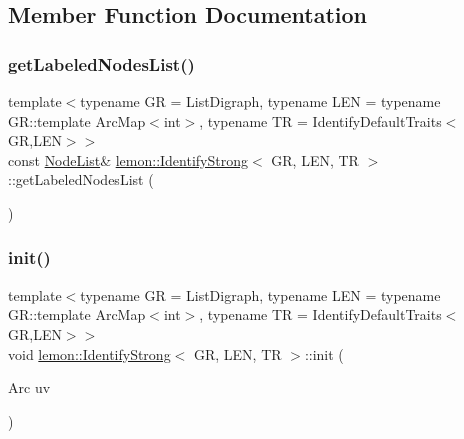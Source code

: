 \subsection{Member Function Documentation}
\mbox{\label{classlemon_1_1_identify_strong_a1d520289257e1b92d98e924c256aee24}} 
\subsubsection{\texorpdfstring{get\+Labeled\+Nodes\+List()}{getLabeledNodesList()}}
{\footnotesize\ttfamily template$<$typename GR  = List\+Digraph, typename L\+EN  = typename G\+R\+::template Arc\+Map$<$int$>$, typename TR  = Identify\+Default\+Traits$<$\+G\+R,\+L\+E\+N$>$$>$ \\
const \hyperlink{classlemon_1_1_identify_strong_a9c68da1def7665b299ca1896f9bdd59d}{Node\+List}\& \hyperlink{classlemon_1_1_identify_strong}{lemon\+::\+Identify\+Strong}$<$ GR, L\+EN, TR $>$\+::get\+Labeled\+Nodes\+List (\begin{DoxyParamCaption}{ }\end{DoxyParamCaption})\hspace{0.3cm}{\ttfamily [inline]}}

\mbox{\label{classlemon_1_1_identify_strong_af427f870411047d02b3896e766e50356}} 
\subsubsection{\texorpdfstring{init()}{init()}}
{\footnotesize\ttfamily template$<$typename GR  = List\+Digraph, typename L\+EN  = typename G\+R\+::template Arc\+Map$<$int$>$, typename TR  = Identify\+Default\+Traits$<$\+G\+R,\+L\+E\+N$>$$>$ \\
void \hyperlink{classlemon_1_1_identify_strong}{lemon\+::\+Identify\+Strong}$<$ GR, L\+EN, TR $>$\+::init (\begin{DoxyParamCaption}\item[{Arc}]{uv }\end{DoxyParamCaption})\hspace{0.3cm}{\ttfamily [inline]}}

